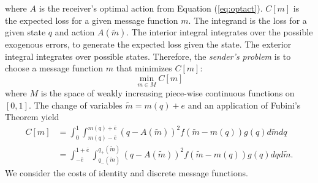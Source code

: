 \documentclass{article}
\begin{document}
where $A$ is the receiver's optimal action from Equation (\ref{eq:optact}). $C[m]$ is the expected loss for a given message function $m$. The integrand is the loss for a given state $q$ and action $A(\widetilde{m})$. The interior integral integrates over the possible exogenous errors, to generate the expected loss given the state. The exterior integral integrates over possible states. Therefore, the \textit{sender's problem} is to choose a message function $m$ that minimizes $C[m]$: 
\begin{equation}
	\min_{m\in M}C[m]
\end{equation}
where $M$ is the space of weakly increasing piece-wise continuous functions on $[0,1]$. The change of variables $\widetilde{m}=m(q)+e$ and an application of Fubini's Theorem yield 
\begin{align}
	C[m]& =\int_{0}^{1}{\int_{m(q)-\bar{e}}^{m(q)+\bar{e}}{(q-A( \widetilde{m}))^{2}f(\widetilde{m}-m(q))g(q)d\widetilde{m}}dq} \\
	& =\int_{-\bar{e}}^{1+\bar{e}}{\int_{q_{-}(\widetilde{m})}^{q_{+}(\widetilde{m})}{(q-A(\widetilde{m}))^{2}f(\widetilde{m}-m(q))g(q)dq}d\widetilde{m}}.
\end{align}
We consider the costs of identity and discrete message functions.

\end{document}
